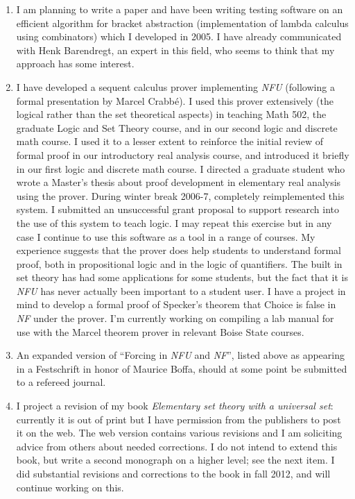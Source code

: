 \begin{description}
\begin{enumerate}
\item I am planning to write a paper and have been writing testing
software on an efficient algorithm for bracket abstraction
(implementation of lambda calculus using combinators) which I
developed in 2005.  I have already communicated with Henk Barendregt,
an expert in this field, who seems to think that my approach has some
interest.

\item I have developed a sequent calculus prover implementing {\em
NFU\/} (following a formal presentation by Marcel Crabb\'e).  I used
this prover extensively (the logical rather than the set theoretical
aspects) in teaching Math 502, the graduate Logic and Set Theory
course, and in our second logic and discrete math course.  I used it
to a lesser extent to reinforce the initial review of formal proof in
our introductory real analysis course, and introduced it briefly in
our first logic and discrete math course.  I directed a graduate
student who wrote a Master's thesis about proof development in
elementary real analysis using the prover.  During winter break
2006-7, completely reimplemented this system.  I submitted an
unsuccessful grant proposal to support research into the use of this
system to teach logic.  I may repeat this exercise but in any case I
continue to use this software as a tool in a range of courses.  My
experience suggests that the prover does help students to understand
formal proof, both in propositional logic and in the logic of
quantifiers.  The built in set theory has had some applications for
some students, but the fact that it is {\em NFU\/} has never actually
been important to a student user.  I have a project in mind to develop
a formal proof of Specker's theorem that Choice is false in {\em NF\/}
under the prover.  I'm currently working on compiling a lab manual for use with the Marcel theorem prover in relevant Boise State courses.

\item An expanded version of ``Forcing in {\em NFU\/} and {\em
NF\/}'', listed above as appearing in a Festschrift in honor of
Maurice Boffa, should at some point be submitted to a refereed
journal.

\item I project a revision of my book {\em Elementary set theory with
a universal set\/}: currently it is out of print but I have permission
from the publishers to post it on the web.  The web version contains
various revisions and I am soliciting advice from others about needed
corrections.  I do not intend to extend this book, but write a second
monograph on a higher level; see the next item.  I did substantial revisions and corrections to the book in fall 2012, and will continue working on this.


\end{enumerate}
\end{description}

